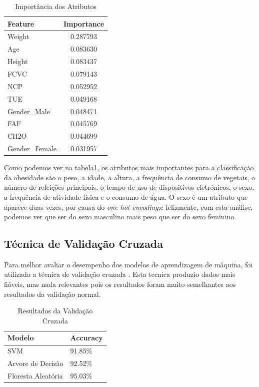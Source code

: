 \documentclass{easychair}
\begin{document}
\begin{table}[hbt!]
  \centering
  \begin{tabular}{l c}
  \toprule
  Feature                    & Importance   \\
  \midrule
  Weight                     & 0.287793     \\
  Age                        & 0.083630     \\
  Height                     & 0.083437     \\
  FCVC                       & 0.079143     \\
  NCP                        & 0.052952     \\
  TUE                        & 0.049168     \\
  Gender\_Male               & 0.048471     \\
  FAF                        & 0.045769     \\
  CH2O                       & 0.044699     \\
  Gender\_Female             & 0.031957     \\
  \bottomrule
  \end{tabular}
  \caption{Importância dos Atributos}
  \label{tab:importance}
\end{table}

Como podemos ver na tabela\ref{tab:importance}, os atributos mais importantes para a classificação da obesidade são o peso, a idade, a altura, a frequência de consumo de vegetais, o número de refeições principais, o tempo de uso de dispositivos eletrónicos, o sexo, a frequência de atividade física e o consumo de água. O sexo é um atributo que aparece duas vezes, por causa do \textit{one-hot encoding};e felizmente, com esta análise, podemos ver que ser do sexo masculino mais peso que ser do sexo feminino.

\subsection{Técnica de Validação Cruzada}

Para melhor avaliar o desempenho dos modelos de aprendizagem de máquina, foi utilizada a técnica de validação cruzada \cite{cross-validation}. Esta tecnica produzio dados mais fiáveis, mas nada relevantes pois os resultados foram muito semelhantes aos resultados da validação normal.

\begin{table}[hbt!]
  \centering
  \begin{tabular}{l l}
  \toprule
  Modelo & Accuracy \\
  \midrule
  SVM & 91.85\% \\
  Arvore de Decisão & 92.52\% \\
  Floresta Aleatória & 95.03\% \\
  \bottomrule
  \end{tabular}
  \caption{Resultados da Validação Cruzada}
  \label{tab:cross-validation}
\end{table}
\end{document}
